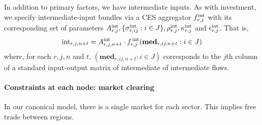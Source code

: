 \documentclass[12pt,a4paper,twoside, draft]{article}
\begin{document}
In addition to primary factors, we have intermediate inputs.
As with investment, we specify intermediate-input bundles via a CES aggregator
$f_{r, j}^{\textup{int}}$ with its corresponding set of parameters
$A_{r, j}^\textup{int}, \{\sigma_{r, ij}^\textup{int}: i \in J\},
\rho_{r, j}^\textup{int}, \kappa_{r, j}^\textup{int} $ and
$\epsilon_{r, j}^\textup{int}$. That is,
\begin{equation}\label{eq-ces-int}
  \textup{int}_{r, j, n + t} = A_{r, j, n + t} ^ \textup{int}
    \cdot f_{r, j} ^ \textup{\,int}(
      \mathbf{med}_{r, ij, n + t}: i \in J
      )
\end{equation}
where, for each $r, j, n$ and $t$, $(\textbf{med}_{r,ij,n + t} : i \in J)$
corresponds to the $j$th column of a standard input-output matrix of
intermediate of intermediate flows.

\paragraph{Constraints at each node: market clearing}
In our canonical model, there is a single market for each sector.
This implies free trade between regions.
\end{document}
